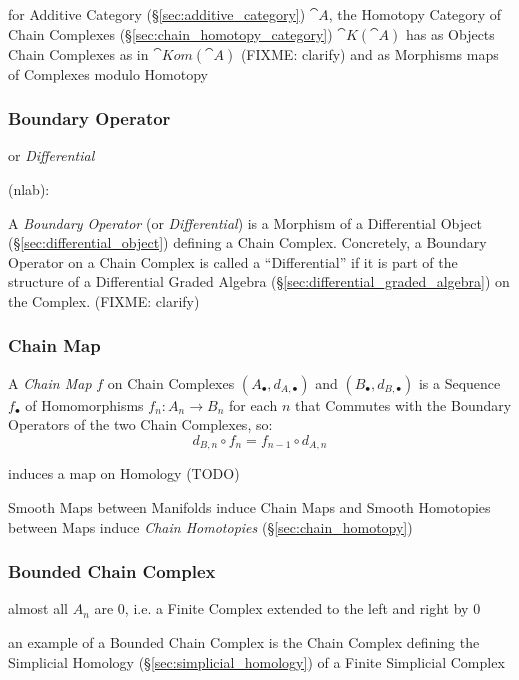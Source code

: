 \fist for Additive Category (\S\ref{sec:additive_category}) $\cat{A}$, the
Homotopy Category of Chain Complexes (\S\ref{sec:chain_homotopy_category})
$\cat{K}(\cat{A})$ has as Objects Chain Complexes as in $\cat{Kom}(\cat{A})$
(FIXME: clarify) and as Morphisms maps of Complexes modulo Homotopy



\subsubsection{Boundary Operator}\label{sec:boundary_operator}

or \emph{Differential}

(nlab):

A \emph{Boundary Operator} (or \emph{Differential}) is a Morphism of a
Differential Object (\S\ref{sec:differential_object}) defining a Chain Complex.
Concretely, a Boundary Operator on a Chain Complex is called a ``Differential''
if it is part of the structure of a Differential Graded Algebra
(\S\ref{sec:differential_graded_algebra}) on the Complex.
(FIXME: clarify)



\subsubsection{Chain Map}\label{sec:chain_map}

A \emph{Chain Map} $f$ on Chain Complexes $(A_\bullet, d_{A,\bullet})$ and
$(B_\bullet, d_{B,\bullet})$ is a Sequence $f_\bullet$ of Homomorphisms $f_n :
A_n \rightarrow B_n$ for each $n$ that Commutes with the Boundary Operators of
the two Chain Complexes, so:
\[
  d_{B,n} \circ f_n = f_{n-1} \circ d_{A,n}
\]

induces a map on Homology (TODO)

Smooth Maps between Manifolds induce Chain Maps and Smooth Homotopies between
Maps induce \emph{Chain Homotopies} (\S\ref{sec:chain_homotopy})



\subsubsection{Bounded Chain Complex}\label{sec:bounded_chain_complex}

almost all $A_n$ are $0$, i.e. a Finite Complex extended to the left and right
by $0$

an example of a Bounded Chain Complex is the Chain Complex defining the
Simplicial Homology (\S\ref{sec:simplicial_homology}) of a Finite Simplicial
Complex



